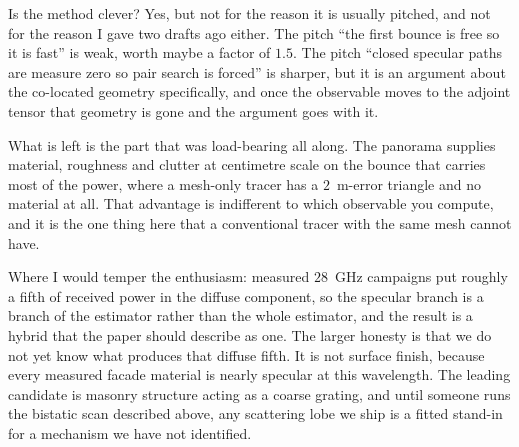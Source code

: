 \documentclass[11pt,a4paper]{article}
\begin{document}
Is the method clever? Yes, but not for the reason it is usually pitched, and not
for the reason I gave two drafts ago either. The pitch ``the first bounce is free
so it is fast'' is weak, worth maybe a factor of $1.5$. The pitch ``closed
specular paths are measure zero so pair search is forced'' is sharper, but it is
an argument about the co-located geometry specifically, and once the observable
moves to the adjoint tensor that geometry is gone and the argument goes with it.

What is left is the part that was load-bearing all along. The panorama supplies
material, roughness and clutter at centimetre scale on the bounce that carries
most of the power, where a mesh-only tracer has a $2$~m-error triangle and no
material at all. That advantage is indifferent to which observable you compute,
and it is the one thing here that a conventional tracer with the same mesh cannot
have.

Where I would temper the enthusiasm: measured $28$~GHz campaigns put roughly a
fifth of received power in the diffuse component, so the specular branch is a
branch of the estimator rather than the whole estimator, and the result is a
hybrid that the paper should describe as one. The larger honesty is that we do
not yet know what produces that diffuse fifth. It is not surface finish, because
every measured facade material is nearly specular at this wavelength. The
leading candidate is masonry structure acting as a coarse grating, and until
someone runs the bistatic scan described above, any scattering lobe we ship is a
fitted stand-in for a mechanism we have not identified.
\end{document}

